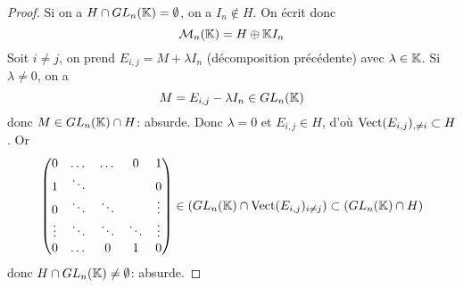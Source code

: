 \begin{proof}
    Si on a $H\cap GL_{n}(\mathbb{K})=\emptyset$, on a $I_{n}\notin H$. On écrit donc 
    \begin{equation}
        \mathcal{M}_{n}(\mathbb{K})=H\oplus \mathbb{K} I_{n}
    \end{equation}
    Soit $i\neq j$, on prend $E_{i,j}=M+\lambda I_{n}$ (décomposition précédente) avec $\lambda\in\mathbb{K}$. Si $\lambda\neq0$, on a
    \begin{equation}
        M=E_{i,j}-\lambda I_{n}\in GL_{n}(\mathbb{K})
    \end{equation}
    donc $M\in GL_{n}(\mathbb{K})\cap H$: absurde. Donc $\lambda=0$ et $E_{i,j}\in H$, d'où $\operatorname{Vect}(E_{i,j})_{,\neq i}\subset H$. Or
    \begin{equation}
        \begin{pmatrix}
            0 & \dots & \dots & 0 & 1\\
            1 & \ddots & & & 0\\
            0 & \ddots & \ddots& & \vdots\\
            \vdots & \ddots & \ddots&\ddots & \vdots\\
            0 & \dots& 0 & 1 & 0
        \end{pmatrix}\in \left(GL_{n}(\mathbb{K})\cap\operatorname{Vect}(E_{i,j})_{i\neq j}\right)\subset \left(GL_{n}(\mathbb{K})\cap H\right)
    \end{equation}
    donc $H\cap GL_{n}(\mathbb{K})\neq\emptyset$: absurde.
\end{proof}


